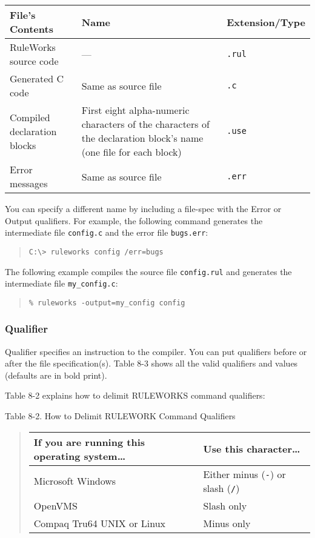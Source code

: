 \begin{tabularx}{\columnwidth}{XXX}
  \toprule
  File's Contents & Name & Extension/Type \\
  \midrule
  RuleWorks source code & --- & \tt{.rul} \\\addlinespace
  Generated C code & Same as source file & \tt{.c} \\\addlinespace
  \raggedright Compiled declaration blocks & First eight alpha-numeric characters of the characters of the declaration block's name (one file for each block) & \tt{.use} \\\addlinespace
  Error messages & Same as source file & \tt{.err} \\
  \bottomrule
\end{tabularx}

You can specify a different name by including a file-spec
with the Error or Output qualifiers. For example, the
following command generates the intermediate file
\verb|config.c| and the error file \verb|bugs.err|:

\begin{quote}
\begin{verbatim}
C:\> ruleworks config /err=bugs
\end{verbatim}
\end{quote}

The following example compiles the source file \verb|config.rul|
and generates the intermediate file \verb|my_config.c|:

\begin{quote}
\begin{verbatim}
% ruleworks -output=my_config config
\end{verbatim}
\end{quote}

\subsubsection{Qualifier}

Qualifier specifies an instruction to the compiler. You can put
qualifiers before or after the file specification(s). Table 8-3 shows
all the valid qualifiers and values (defaults are in bold print).

Table 8-2 explains how to delimit RULEWORKS command
qualifiers:

Table 8-2. How to Delimit RULEWORK Command Qualifiers

\begin{quote}
\begin{tabular}{ll}
  \toprule
  If you are running this operating system\ldots & Use this character\ldots \\
  \midrule
  Microsoft Windows & Either minus (\verb|-|) or slash (\verb|/|) \\
  OpenVMS & Slash only \\
  Compaq Tru64 UNIX or Linux & Minus only \\
  \bottomrule
\end{tabular}
\end{quote}

